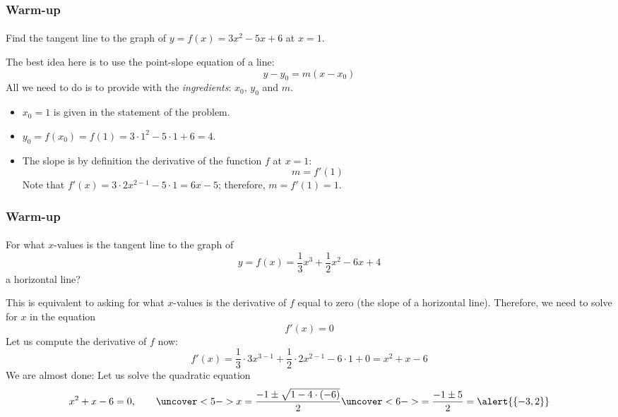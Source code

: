 \documentclass[9pt,xcolor=x11names,compress]{beamer}
\begin{document}
\begin{frame}\frametitle{Warm-up}
\framesubtitle{}
\begin{example}
	Find the tangent line to the graph of $y=f(x)=3x^2-5x+6$ at $x=1$.
\end{example}
\pause The best idea here is to use the point-slope equation of a line:
\begin{equation*}
	y-y_0 = m(x-x_0)
\end{equation*}
All we need to do is to provide with the \emph{ingredients}: $x_0$, $y_0$ and $m$.\pause
\begin{itemize}[<+->]
	\item $x_0=1$ is given in the statement of the problem.
	\item $y_0=f(x_0)=f(1)=3\cdot 1^2-5\cdot 1 + 6 =4$.
	\item The slope is by definition the derivative of the function $f$ at $x=1$: 
	\begin{equation*}
		m=f'(1)
	\end{equation*}
	Note that $f'(x)=3\cdot 2x^{2-1}-5\cdot 1=6x-5$; therefore, $m=f'(1)=1$.
\end{itemize}
\end{frame}

\begin{frame}\frametitle{Warm-up}
\framesubtitle{}
\begin{example}
For what $x$-values is the tangent line to the graph of 
\begin{equation*}
y=f(x)=\frac{1}{3}x^3+\frac{1}{2}x^2-6x+4
\end{equation*} a horizontal line?
\end{example}
\pause This is equivalent to asking for what $x$-values is the derivative of $f$ equal to zero (the slope of a horizontal line).  Therefore, we need to solve for $x$ in the equation
\begin{equation*}
	f'(x)=0
\end{equation*}
\pause Let us compute the derivative of $f$ now:
\begin{equation*}
	f'(x)=\frac{1}{3}\cdot 3x^{3-1} + \frac{1}{2}\cdot 2x^{2-1} - 6\cdot 1 + 0 = x^2+x-6
\end{equation*}
\pause We are almost done:  Let us solve the quadratic equation
\begin{equation*}
	x^2+x-6=0,\qquad \uncover<5->{x=\frac{-1\pm \sqrt{1-4\cdot(-6)}}{2}} \uncover<6->{=\frac{-1\pm 5}{2} = \alert{\{-3, 2\}}}
\end{equation*}
\end{frame}
\end{document}
